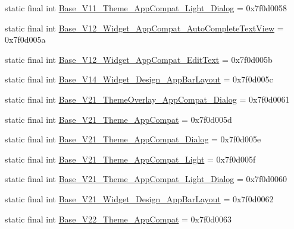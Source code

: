 \begin{DoxyCompactItemize}
\item 
static final int \mbox{\hyperlink{classandroid_1_1support_1_1design_1_1R_1_1style_a2065053a023cfdf714de0262b23016ba}{Base\+\_\+\+V11\+\_\+\+Theme\+\_\+\+App\+Compat\+\_\+\+Light\+\_\+\+Dialog}} = 0x7f0d0058
\item 
static final int \mbox{\hyperlink{classandroid_1_1support_1_1design_1_1R_1_1style_a6f46cb91a0f1775c5399547dca533f7f}{Base\+\_\+\+V12\+\_\+\+Widget\+\_\+\+App\+Compat\+\_\+\+Auto\+Complete\+Text\+View}} = 0x7f0d005a
\item 
static final int \mbox{\hyperlink{classandroid_1_1support_1_1design_1_1R_1_1style_a2ef7dc7719b4995a7d83175eba5cc94d}{Base\+\_\+\+V12\+\_\+\+Widget\+\_\+\+App\+Compat\+\_\+\+Edit\+Text}} = 0x7f0d005b
\item 
static final int \mbox{\hyperlink{classandroid_1_1support_1_1design_1_1R_1_1style_af87dcb855144d2286beeaf7ef423efab}{Base\+\_\+\+V14\+\_\+\+Widget\+\_\+\+Design\+\_\+\+App\+Bar\+Layout}} = 0x7f0d005c
\item 
static final int \mbox{\hyperlink{classandroid_1_1support_1_1design_1_1R_1_1style_a6ec8c1bf9ab5458f83c6c2b2d1b7247e}{Base\+\_\+\+V21\+\_\+\+Theme\+Overlay\+\_\+\+App\+Compat\+\_\+\+Dialog}} = 0x7f0d0061
\item 
static final int \mbox{\hyperlink{classandroid_1_1support_1_1design_1_1R_1_1style_a045c026a1af92dd4ce48bf60c97acc81}{Base\+\_\+\+V21\+\_\+\+Theme\+\_\+\+App\+Compat}} = 0x7f0d005d
\item 
static final int \mbox{\hyperlink{classandroid_1_1support_1_1design_1_1R_1_1style_a51e2e39ba5d5b1fee8e36f3f94ba322c}{Base\+\_\+\+V21\+\_\+\+Theme\+\_\+\+App\+Compat\+\_\+\+Dialog}} = 0x7f0d005e
\item 
static final int \mbox{\hyperlink{classandroid_1_1support_1_1design_1_1R_1_1style_a556541f7e4e26b1bcb1ff6453aabb3f3}{Base\+\_\+\+V21\+\_\+\+Theme\+\_\+\+App\+Compat\+\_\+\+Light}} = 0x7f0d005f
\item 
static final int \mbox{\hyperlink{classandroid_1_1support_1_1design_1_1R_1_1style_a48e4536d181ab3cb02271d068b3c5443}{Base\+\_\+\+V21\+\_\+\+Theme\+\_\+\+App\+Compat\+\_\+\+Light\+\_\+\+Dialog}} = 0x7f0d0060
\item 
static final int \mbox{\hyperlink{classandroid_1_1support_1_1design_1_1R_1_1style_ae7c941fba583ed0b9bf119441b8b0100}{Base\+\_\+\+V21\+\_\+\+Widget\+\_\+\+Design\+\_\+\+App\+Bar\+Layout}} = 0x7f0d0062
\item 
static final int \mbox{\hyperlink{classandroid_1_1support_1_1design_1_1R_1_1style_aa23076039edd6ad473bdc34aa6d8547b}{Base\+\_\+\+V22\+\_\+\+Theme\+\_\+\+App\+Compat}} = 0x7f0d0063

\end{DoxyCompactItemize}

